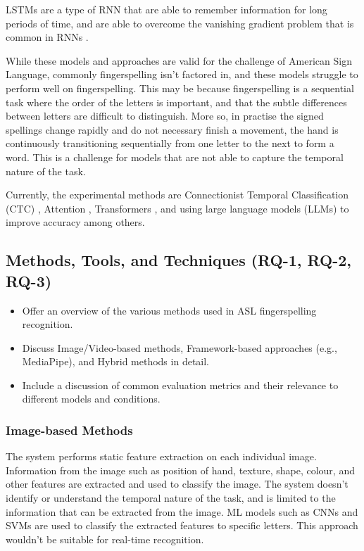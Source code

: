 LSTMs are a type of RNN that are able to remember information for long periods of time, and are able to overcome the vanishing gradient problem that is common in RNNs \cite{sherstinskyFundamentalsRecurrentNeural2020}.


While these models and approaches are valid for the challenge of American Sign Language, commonly fingerspelling isn't factored in, and these models struggle to perform well on fingerspelling. This may be because fingerspelling is a sequential task where the order of the letters is important, and that the subtle differences between letters are difficult to distinguish. More so, in practise the signed spellings change rapidly and do not necessary finish a movement, the hand is continuously transitioning sequentially from one letter to the next to form a word. This is a challenge for models that are not able to capture the temporal nature of the task.

Currently, the experimental methods are Connectionist Temporal Classification (CTC) \cite{gravesConnectionistTemporalClassification2006a, shiAmericanSignLanguage2018}, Attention \cite{bahdanauNeuralMachineTranslation2016}, Transformers \cite{vaswaniAttentionAllYou2023}, and using large language models (LLMs) to improve accuracy among others.

\begin{landscape}
    
\end{landscape}

\subsection{Methods, Tools, and Techniques (RQ-1, RQ-2, RQ-3)}

\begin{itemize}
    \item Offer an overview of the various methods used in ASL fingerspelling recognition.
    \item Discuss Image/Video-based methods, Framework-based approaches (e.g., MediaPipe), and Hybrid methods in detail.
    \item Include a discussion of common evaluation metrics and their relevance to different models and conditions.
\end{itemize}

\subsubsection{Image-based Methods}
The system performs static feature extraction on each individual image. Information from the image such as position of hand, texture, shape, colour, and other features are extracted and used to classify the image. The system doesn't identify or understand the temporal nature of the task, and is limited to the information that can be extracted from the image. ML models such as CNNs and SVMs are used to classify the extracted features to specific letters. This approach wouldn't be suitable for real-time recognition.
